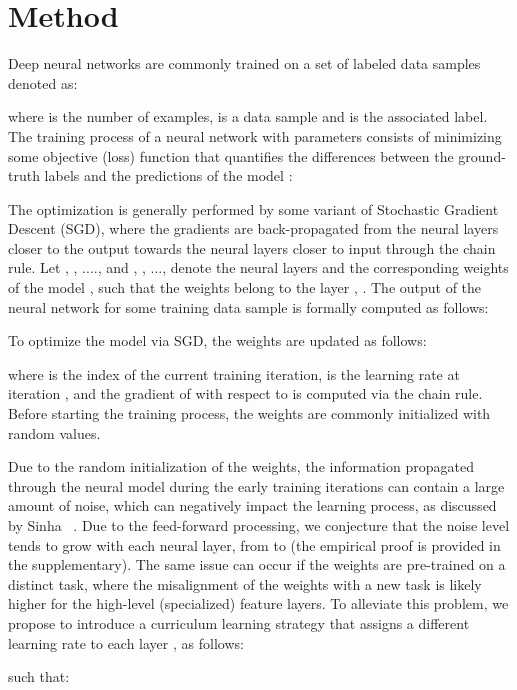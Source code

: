 \documentclass[10pt,twocolumn,letterpaper]{article}
\begin{document}
\vspace{-0.15cm}
\section{Method}
\vspace{-0.1cm}

Deep neural networks are commonly trained on a set of labeled data samples denoted as:

where  is the number of examples,  is a data sample and  is the associated label. The training process of a neural network  with parameters  consists of minimizing some objective (loss) function  that quantifies the differences between the ground-truth labels and the predictions of the model :


The optimization is generally performed by some variant of Stochastic Gradient Descent (SGD), where the gradients are back-propagated from the neural layers closer to the output towards the neural layers closer to input through the chain rule. Let , , ....,  and , , ...,  denote the neural layers and the corresponding weights of the model , such that the weights  belong to the layer , . The output of the neural network for some training data sample  is formally computed as follows:


To optimize the model via SGD, the weights are updated as follows:

where  is the index of the current training iteration,  is the learning rate at iteration , and the gradient of  with respect to  is computed via the chain rule. Before starting the training process, the weights  are commonly initialized with random values. 

Due to the random initialization of the weights, the information propagated through the neural model during the early training iterations can contain a large amount of noise, which can negatively impact the learning process, as discussed by Sinha \etal~\cite{Sinha-NIPS-2020}. Due to the feed-forward processing, we conjecture that the noise level tends to grow with each neural layer, from  to  (the empirical proof is provided in the supplementary). The same issue can occur if the weights are pre-trained on a distinct task, where the misalignment of the weights with a new task is likely higher for the high-level (specialized) feature layers. To alleviate this problem, we propose to introduce a curriculum learning strategy that assigns a different learning rate  to each layer , as follows:

such that:
\end{document}
